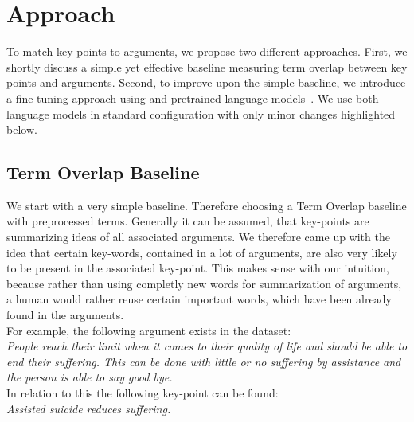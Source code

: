 \section{Approach}\label{approach}

To match key points to arguments, we propose two different approaches.
First, we shortly discuss a simple yet effective baseline measuring term overlap between key points and arguments.
Second, to improve upon the simple baseline, we introduce a fine-tuning approach using \Bert and \Roberta pretrained language models~\cite{DevlinCLT2019,LiuOGDJCLLZS2019}. We use both language models in standard configuration with only minor changes highlighted below.

\subsection{Term Overlap Baseline}

We start with a very simple baseline. Therefore choosing a Term Overlap baseline with preprocessed terms. 
Generally it can be assumed, that key-points are summarizing ideas of all associated arguments. We therefore came up with the idea
that certain key-words, contained in a lot of arguments, are also very likely to be present in the associated key-point. This makes 
sense with our intuition, because rather than using completly new words for summarization of arguments, a human would 
rather reuse certain important words, which have been already found in the arguments.\\
For example, the following argument exists in the \ArgKP dataset:\\
\textit{People reach their limit when it comes to 
their quality of life and should be able to end their {\color{blue} suffering}. This can be done with little 
or no {\color{blue} suffering} by {\color{orange} assistance} and the person is able to say good bye.}\\ 

In relation to this the following key-point can be found:\\
\textit{{\color{orange} Assisted} suicide reduces {\color{blue} suffering}.}\\

